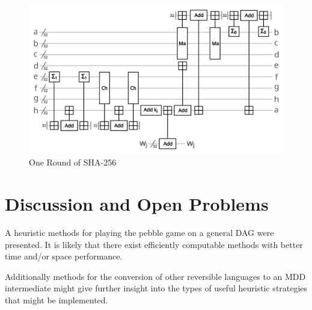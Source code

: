 \begin{figure}
      \capstart
      \centering
      \includegraphics[width=0.9\hsize]{images/sha_round}
      \caption{One Round of SHA-256}
      \label{fig:sha}
\end{figure}

\section{Discussion and Open Problems} 

A heuristic methods for playing the pebble game on a general DAG were
presented. It is likely that there exist efficiently computable methods with
better time and/or space performance.  

Additionally methods for the conversion of other reversible languages to an MDD
intermediate might give further insight into the types of useful heuristic
strategies that might be implemented. 
